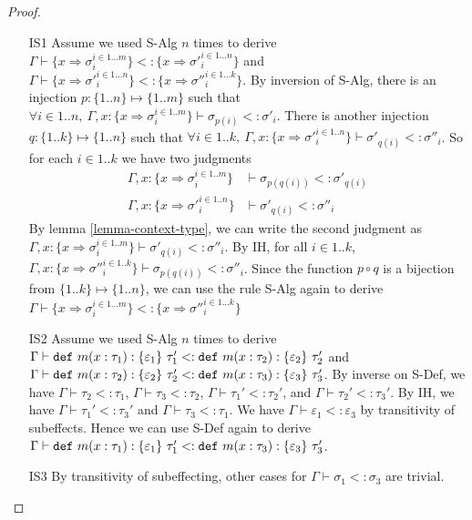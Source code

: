 \begin{proof}
\begin{itemize}
\item[IS1] Assume we used S-Alg $n$ times to derive $\Gamma \vdash \{x \Rightarrow \sigma_i^{i\in1...m}\} <:  \{x \Rightarrow {\sigma'}_i^{i\in1...n}\} $ and \mbox{$\Gamma \vdash \{x \Rightarrow {\sigma'}_i^{i\in1...n}\} <:  \{x \Rightarrow {\sigma''}_i^{i\in1...k}\}$}. By inversion of S-Alg, there is an injection $p: \{1..n\} \mapsto  \{1..m\}$ such that $\forall i \in 1..n,\ \Gamma, x: \{x \Rightarrow {\sigma}_i^{i\in 1..m} \} \vdash \sigma_{p(i)} <: \sigma'_i$. There is another injection $q: \{1..k\} \mapsto \{1..n\}$ such that $\forall i \in 1..k,\ \Gamma, x: \{x \Rightarrow {\sigma'}_i^{i\in 1..n} \} \vdash \sigma'_{q(i)} <: \sigma''_i$. So for each $i \in 1..k$ we have two judgments 
\begin{align*}
\Gamma, x: \{x \Rightarrow {\sigma}_i^{i\in 1..m} \} &\vdash \sigma_{p(q(i))} <: \sigma'_{q(i)}\\
\Gamma, x: \{x \Rightarrow {\sigma'}_i^{i\in 1..n} \} &\vdash \sigma'_{q(i)} <: \sigma''_i
\end{align*}
By lemma \ref{lemma-context-type}, we can write the second judgment as $\Gamma, x: \{x \Rightarrow {\sigma}_i^{i\in 1..m} \} \vdash \sigma'_{q(i)} <: \sigma''_{i}$. By IH, for all $i \in 1..k$, $ \Gamma, x: \{x \Rightarrow {\sigma''}_i^{i\in 1..k} \} \vdash \sigma_{p(q(i))} <: \sigma''_i$. Since the  function $p \circ q$ is a bijection from $\{1..k\} \mapsto \{1..n\}$, we can use the rule S-Alg again to derive $\Gamma \vdash \{x \Rightarrow \sigma_i^{i\in1...m}\} <:  \{x \Rightarrow {\sigma''}_i^{i\in1...k}\} $ 
\item[IS2] Assume we used S-Alg $n$ times to derive 
$\Gamma \vdash \mathtt{def}~ m(x : \tau_1) : \{ \varepsilon_1 \}~\tau_1' <: \mathtt{def}~ m(x : \tau_2) : \{ \varepsilon_2 \}~\tau_2'$
and
$\Gamma \vdash \mathtt{def}~ m(x : \tau_2) : \{ \varepsilon_2 \}~\tau_2' <: \mathtt{def}~ m(x : \tau_3) : \{ \varepsilon_3 \}~\tau_3'$. By inverse on S-Def, we have $\Gamma \vdash \tau_2 <: \tau_1$, $\Gamma \vdash \tau_3 <: \tau_2$, $\Gamma \vdash \tau_1' <: \tau_2'$, and $\Gamma \vdash \tau_2' <: \tau_3'$. By IH, we have $\Gamma \vdash \tau_1' <: \tau_3'$ and $\Gamma \vdash \tau_3 <: \tau_1$. We have $\Gamma \vdash \varepsilon_1 <: \varepsilon_3$ by transitivity of subeffects. Hence we can use S-Def again to derive $\Gamma \vdash \mathtt{def}~ m(x : \tau_1) : \{ \varepsilon_1 \}~\tau_1' <: \mathtt{def}~ m(x : \tau_3) : \{ \varepsilon_3 \}~\tau_3'$. 
\item[IS3] By transitivity of subeffecting, other cases for $\Gamma \vdash \sigma_1 <: \sigma_3$ are trivial. 

\end{itemize}
\end{proof}



